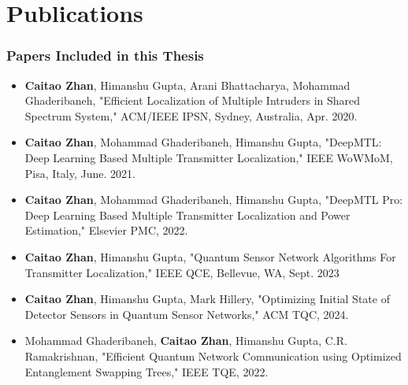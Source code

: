 \chapter{Publications}

\subsection*{Papers Included in this Thesis}
\begin{itemize}
    \item \textbf{Caitao Zhan}, Himanshu Gupta, Arani Bhattacharya, Mohammad Ghaderibaneh, "Efficient Localization of Multiple Intruders in Shared Spectrum System," ACM/IEEE IPSN, Sydney, Australia, Apr. 2020.

    \item \textbf{Caitao Zhan}, Mohammad Ghaderibaneh, Himanshu Gupta, "DeepMTL: Deep Learning Based Multiple Transmitter Localization," IEEE WoWMoM, Pisa, Italy, June. 2021. 

    \item \textbf{Caitao Zhan}, Mohammad Ghaderibaneh, Himanshu Gupta, "DeepMTL Pro: Deep Learning Based Multiple Transmitter Localization and Power Estimation," Elsevier PMC, 2022.

    \item \textbf{Caitao Zhan}, Himanshu Gupta, "Quantum Sensor Network Algorithms For Transmitter Localization," IEEE QCE, Bellevue, WA, Sept. 2023
    
    \item \textbf{Caitao Zhan}, Himanshu Gupta, Mark Hillery, "Optimizing Initial State of Detector Sensors in Quantum Sensor Networks," ACM TQC, 2024.

    \item Mohammad Ghaderibaneh, \textbf{Caitao Zhan}, Himanshu Gupta, C.R. Ramakrishnan, "Efficient Quantum Network Communication using Optimized Entanglement Swapping Trees," IEEE TQE, 2022.


\end{itemize}

